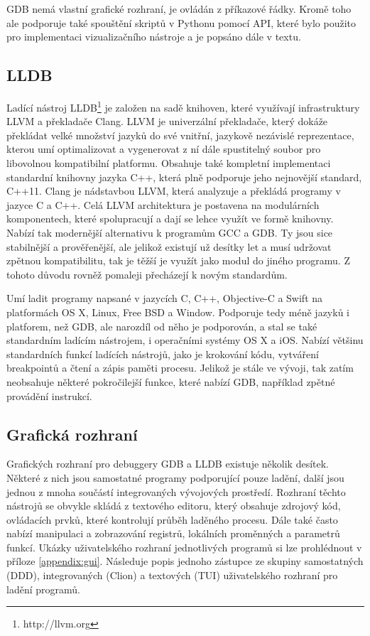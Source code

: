 \documentclass[bc,male,python,dept460]{diploma}						%
\newcommand{\parspace}[1][]{
	\ifthenelse{\isempty{#1}}{\vspace{5mm}}{\vspace{#1}}
	\par
}
\begin{document}
		GDB nemá vlastní grafické rozhraní, je ovládán z příkazové řádky. Kromě toho ale podporuje také spouštění skriptů v Pythonu pomocí API,
		které bylo použito pro implementaci vizualizačního nástroje a je popsáno dále v textu.
	\subsection{LLDB}
		Ladící nástroj LLDB\footnote{http://llvm.org} je založen na sadě knihoven, které využívají infrastruktury LLVM a překladače Clang.
		LLVM je univerzální překladače, který dokáže překládat velké množství jazyků do své vnitřní, jazykově nezávislé reprezentace, kterou umí
		optimalizovat a vygenerovat z ní dále spustitelný soubor pro libovolnou kompatibilní platformu. Obsahuje také kompletní implementaci standardní
		knihovny jazyka C++, která plně podporuje jeho nejnovější standard, C++11. Clang je nádstavbou LLVM, která analyzuje a překládá programy v jazyce
		C a C++. Celá LLVM architektura je postavena na modulárních komponentech, které spolupracují a dají se lehce využít ve formě knihovny.
		Nabízí tak modernější alternativu k programům GCC a GDB. Ty jsou sice stabilnější a prověřenější, ale jelikož existují už desítky let a musí udržovat
		zpětnou kompatibilitu, tak je těžší je využít jako modul do jiného programu. Z tohoto důvodu rovněž pomaleji přecházejí k novým standardům.
		
		\parspace Umí ladit programy napsané v jazycích C, C++, Objective-C a Swift na platformách OS X, Linux, Free BSD a Window. Podporuje tedy méně jazyků i platforem,
		než GDB, ale narozdíl od něho je podporován, a stal se také standardním ladícím nástrojem, i operačními systémy OS X a iOS. Nabízí většinu standardních
		funkcí ladících nástrojů, jako je krokování kódu, vytváření breakpointů a čtení a zápis paměti procesu. Jelikož je stále ve vývoji, tak zatím neobsahuje 
		některé pokročilejší funkce, které nabízí GDB, například zpětné provádění instrukcí.

	\subsection{Grafická rozhraní}
		Grafických rozhraní pro debuggery GDB a LLDB existuje několik desítek. Některé z nich jsou samostatné programy podporující pouze ladění, další jsou
		jednou z mnoha součástí integrovaných vývojových prostředí. Rozhraní těchto nástrojů se obvykle skládá z textového editoru, který obsahuje zdrojový kód,
		ovládacích prvků, které kontrolují průběh laděného procesu. Dále také často nabízí manipulaci a zobrazování registrů, lokálních proměnných a parametrů
		funkcí. Ukázky uživatelského rozhraní jednotlivých programů si lze prohlédnout v příloze \ref{appendix:gui}. Následuje popis jednoho zástupce
		ze skupiny samostatných (DDD), integrovaných (Clion) a textových (TUI) uživatelského rozhraní pro ladění programů.
	
\end{document}
